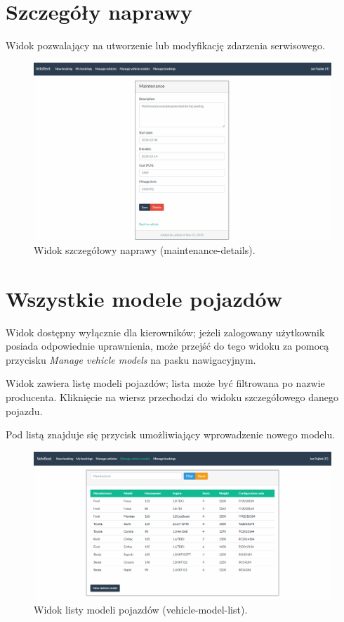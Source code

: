 \documentclass[eng,printmode,openany]{mgr}
\begin{document}
\begin{appendices}
		\section{Szczegóły naprawy}
		Widok pozwalający na utworzenie lub modyfikację zdarzenia serwisowego.
		\begin{figure}[H]
			\centering
			\includegraphics[scale=0.32]{images/views/maintenance-detail.png}
			\caption{Widok szczegółowy naprawy (maintenance-details).}
		\end{figure}
		
		\newpage	
		\section{Wszystkie modele pojazdów}	
		Widok dostępny wyłącznie dla kierowników; jeżeli zalogowany użytkownik posiada odpowiednie uprawnienia, może przejść do tego widoku za pomocą przycisku \textit{Manage vehicle models} na pasku nawigacyjnym.
		
		Widok zawiera listę modeli pojazdów; lista może być filtrowana po nazwie producenta. Kliknięcie na wiersz przechodzi do widoku szczegółowego danego pojazdu.
		
		Pod listą znajduje się przycisk umożliwiający wprowadzenie nowego modelu.
		\begin{figure}[H]
			\centering
			\includegraphics[width=\textwidth]{images/views/vehicle-model-list.png}
			\caption{Widok listy modeli pojazdów (vehicle-model-list).}
		\end{figure}
		

\end{appendices}
\end{document}
